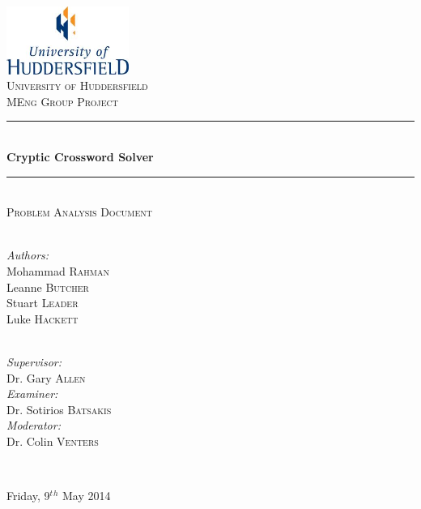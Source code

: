 \newcommand{\HRule}{\rule{\linewidth}{0.5mm}}

\begin{titlepage}
  \begin{center}

  \includegraphics[width=0.3\textwidth]{../UoHLogo.jpg} \\[2.5cm]

  \textsc{\LARGE University of Huddersfield} \\[1.5cm]

  \textsc{\Large MEng Group Project} \\[0.75cm]

  \HRule \\[0.4cm]
    { \huge \bfseries Cryptic Crossword Solver }
  \\[0.1cm]

  \HRule \\[0.75cm]

  \textsc{\Large Problem Analysis Document} \\[2cm]

  \begin{minipage}{0.4\textwidth}
    \begin{flushleft} \large  ~\\
      \emph{Authors:}          \\[0.5ex]
      Mohammad \textsc{Rahman} \\[0.5ex]
      Leanne \textsc{Butcher}  \\[0.5ex]
      Stuart \textsc{Leader}   \\[0.5ex]
      Luke \textsc{Hackett} 
    \end{flushleft}
  \end{minipage}
  \begin{minipage}{0.4\textwidth}
    \begin{flushright} \large ~\\
      \emph{Supervisor:} \\ 
      Dr. Gary \textsc{Allen}
      ~\\[1ex]
      \emph{Examiner:} \\
      Dr. Sotirios \textsc{Batsakis}
      ~\\[1ex]
      \emph{Moderator:} \\
      Dr. Colin \textsc{Venters} 
    \end{flushright}
  \end{minipage}

  ~\\[0.01cm]


  \vfill

  {\large Friday, 9$^t$$^h$ May 2014}

  \end{center}
\end{titlepage}
